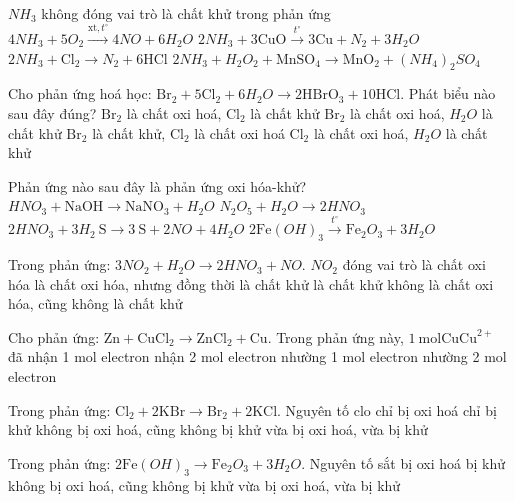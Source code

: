 \begin{ex}
	$NH_3$ không đóng vai trò là chất khử trong phản ứng
	\choice
	{$4NH_3+5O_2\xrightarrow{\mathrm{xt},t^{\circ}} 4NO+6H_2O$}
	{$2NH_3+3\mathrm{CuO} \xrightarrow{t^{\circ}} 3\mathrm{Cu}+N_2+3H_2O$}
	{$2NH_3+\mathrm{Cl}_2\to N_2+6\mathrm{HCl}$}
	{$2NH_3+H_2O_2+\mathrm{MnSO}_4\to \mathrm{MnO}_2+\left(NH_4\right)_2SO_4$}
	\loigiai{}
\end{ex}
\begin{ex}
	Cho phản ứng hoá học: $\mathrm{Br}_2+5\mathrm{Cl}_2+6H_2O\to 2\mathrm{HBrO}_3+10\mathrm{HCl}$. Phát biểu nào sau đây đúng?
	\choice
	{$\mathrm{Br}_2$ là chất oxi hoá, $\mathrm{Cl}_2$ là chất khử}
	{$\mathrm{Br}_2$ là chất oxi hoá, $H_2O$ là chất khử}
	{$\mathrm{Br}_2$ là chất khử, $\mathrm{Cl}_2$ là chất oxi hoá}
	{$\mathrm{Cl}_2$ là chất oxi hoá, $H_2O$ là chất khử}
	\loigiai{}
\end{ex}
\begin{ex}
	Phản ứng nào sau đây là phản ứng oxi hóa-khử?
	\choice
	{$HNO_3+\mathrm{NaOH} \to \mathrm{NaNO}_3+H_2O$}
	{$N_2 O_5+H_2O \to 2 HNO_3$}
	{$2 HNO_3+3 H_2 \mathrm{~S} \to 3 \mathrm{~S}+2 NO+4 H_2O$}
	{$2 \mathrm{Fe}(OH)_3 \xrightarrow{t^{\circ}} \mathrm{Fe}_2 O_3+3 H_2O$}
	\loigiai{}
\end{ex}
\begin{ex}
	Trong phản ứng: $3 NO_2+H_2O \to 2 HNO_3+NO$. $NO_2$ đóng vai trò
	\choice
	{là chất oxi hóa}
	{là chất oxi hóa, nhưng đồng thời là chất khử}
	{là chất khử}
	{không là chất oxi hóa, cũng không là chất khử}
	\loigiai{}
\end{ex}
\begin{ex}
	Cho phản ứng: $\mathrm{Zn}+\mathrm{CuCl}_2\to \mathrm{ZnCl}_2+\mathrm{Cu}$. Trong phản ứng này, $1\mathrm{~mol} \mathrm{Cu} \mathrm{Cu}^{2+}$ đã
	\choice
	{nhận 1 mol electron}
	{nhận 2 mol electron}
	{nhường 1 mol electron}
	{nhường 2 mol electron}
	\loigiai{}
\end{ex}
\begin{ex}
	Trong phản ứng: $\mathrm{Cl}_2+2\mathrm{KBr} \to \mathrm{Br}_2+2\mathrm{KCl}$. Nguyên tố clo
	\choice
	{chỉ bị oxi hoá}
	{chỉ bị khử}
	{không bị oxi hoá, cũng không bị khử}
	{vừa bị oxi hoá, vừa bị khử}
	\loigiai{}
\end{ex}
\begin{ex}
	Trong phản ứng: $2 \mathrm{Fe}(OH)_3 \to \mathrm{Fe}_2 O_3+3 H_2O$. Nguyên tố sắt
	\choice
	{bị oxi hoá}
	{bị khử}
	{không bị oxi hoá, cũng không bị khử}
	{vừa bị oxi hoá, vừa bị khử}
	\loigiai{}
\end{ex}
